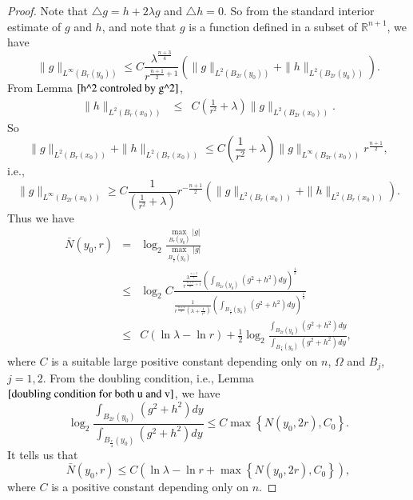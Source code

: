 \documentclass[a4paper, 12pt, onecolumn]{article} \textwidth 148mm
\begin{document}
\begin{proof}
Note that $\triangle g=h+2\lambda g$ and $\triangle h=0$. So from the standard interior estimate of $g$ and $h$, and note that $g$ is a function defined in a subset of $\mathbb{R}^{n+1}$, we have
\begin{equation*}
\|g\|_{L^{\infty}(B_r(y_0))}\leq C\frac{\lambda^{\frac{n+3}{4}}}{r^{\frac{n+1}{2}+1}}\left(\|g\|_{L^2(B_{2r}(y_0))}+\|h\|_{L^2(B_{2r}(y_0))}\right).
\end{equation*}
From Lemma $\ref{h^2 controled by g^2}$,
\begin{eqnarray*}
\|h\|_{L^2(B_r(x_0))}&\leq&C\left(\frac{1}{r^2}+\lambda\right)\|g\|_{L^2(B_{2r}(x_0))}.
\end{eqnarray*}
So
\begin{equation*}
\|g\|_{L^2(B_r(x_0))}+\|h\|_{L^2(B_r(x_0))}\leq C\left(\frac{1}{r^2}+\lambda\right)\|g\|_{L^{\infty}(B_{2r}(x_0))}r^{\frac{n+1}{2}},
\end{equation*}
i.e.,
\begin{equation*}
\|g\|_{L^{\infty}(B_{2r}(x_0))}\geq
C\frac{1}{\left(\frac{1}{r^2}+\lambda\right)}r^{-\frac{n+1}{2}}(\|g\|_{L^2(B_r(x_0))}+\|h\|_{L^2(B_r(x_0))}).
\end{equation*}
Thus we have
\begin{eqnarray*}
\bar{N}(y_0,r)&=&\log_2\frac{\max\limits_{B_r(y_0)}|g|}{\max\limits_{B_{\frac{r}{2}}(y_0)}|g|}
\\&\leq&\log_2C\frac{\frac{\lambda^{\frac{n+3}{4}}}
{r^{\frac{n+1}{2}+1}}\left(\int_{B_{2r}(y_0)}(g^2+h^2)dy\right)^{\frac{1}{2}}}
{\frac{1}{r^{\frac{n+1}{2}}\left(\lambda+\frac{1}{r^2}\right)}
\left(\int_{B_{\frac{r}{4}}(y_0)}(g^2+h^2)dy\right)^{\frac{1}{2}}}
\\&\leq&C(\ln\lambda-\ln r)+
\frac{1}{2}\log_2\frac{\int_{B_{2r}(y_0)}
(g^2+h^2)dy}{\int_{B_{\frac{r}{4}}(y_0)}(g^2+h^2)dy},
\end{eqnarray*}
where $C$ is a suitable large positive constant depending only on $n$, $\Omega$ and $B_j$, $j=1,2$.
From the doubling condition, i.e., Lemma $\ref{doubling condition for both u and v}$, we have
\begin{equation*}
\log_2\frac{\int_{B_{2r}(y_0)}(g^2+h^2)dy}{\int_{B_{\frac{r}{4}}(y_0)}(g^2+h^2)dy}\leq C\max\left\{N(y_0,2r),C_0\right\}.
\end{equation*}
It tells us that
\begin{equation*}
\bar{N}(y_0,r)\leq C(\ln\lambda-\ln r+\max\left\{N(y_0,2r),C_0\right\}),
\end{equation*}
where $C$ is a positive constant depending only on $n$.

\end{proof}
\end{document}

